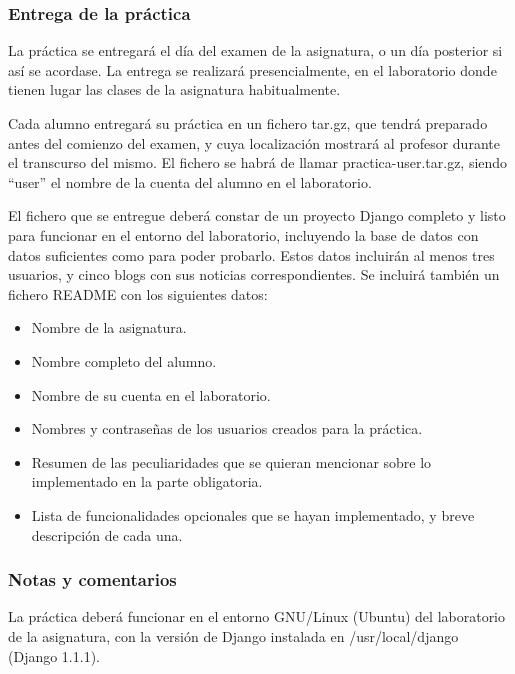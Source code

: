 \subsubsection{Entrega de la práctica}

La práctica se entregará el día del examen de la asignatura, o un día posterior si así se acordase. La entrega se realizará presencialmente, en el laboratorio donde tienen lugar las clases de la asignatura habitualmente.

Cada alumno entregará su práctica en un fichero tar.gz, que tendrá preparado antes del comienzo del examen, y cuya localización mostrará al profesor durante el transcurso del mismo. El fichero se habrá de llamar practica-user.tar.gz, siendo ``user'' el nombre de la cuenta del alumno en el laboratorio.

El fichero que se entregue deberá constar de un proyecto Django completo y listo para funcionar en el entorno del laboratorio, incluyendo la base de datos con datos suficientes como para poder probarlo. Estos datos incluirán al menos tres usuarios, y cinco blogs con sus noticias correspondientes. Se incluirá también un fichero README con los siguientes datos:

\begin{itemize}
\item Nombre de la asignatura.
\item Nombre completo del alumno.
\item Nombre de su cuenta en el laboratorio.
\item Nombres y contraseñas de los usuarios creados para la práctica.
\item Resumen de las peculiaridades que se quieran mencionar sobre lo implementado en la parte obligatoria.
\item Lista de funcionalidades opcionales que se hayan implementado, y breve descripción de cada una.
\end{itemize}

\subsubsection{Notas y comentarios}

La práctica deberá funcionar en el entorno GNU/Linux (Ubuntu) del laboratorio de la asignatura, con la versión de Django instalada en /usr/local/django (Django 1.1.1).

